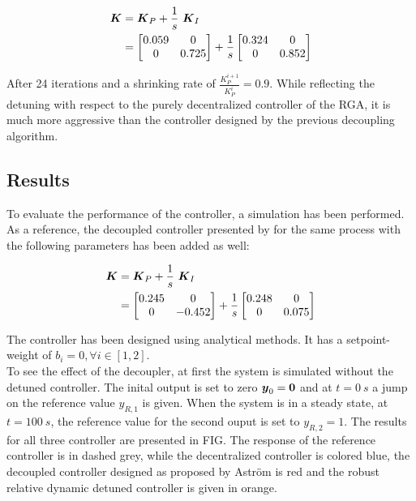 \begin{align*}
\mbox{\boldmath$K$} &= \mbox{\boldmath$K$}_P + \frac{1}{s}~ \mbox{\boldmath$K$}_I\\
&= \begin{bmatrix}
0.059 & 0 \\
0 & 0.725
\end{bmatrix}
+ \frac{1}{s}\begin{bmatrix}
0.324 & 0 \\
0 & 0.852
\end{bmatrix}
\end{align*}

After 24 iterations and a shrinking rate of $\frac{K_P^{i+1}}{K_P^{i}} = 0.9 $. While reflecting the detuning with respect to the purely decentralized controller of the RGA, it is much more aggressive than the controller designed by the previous decoupling algorithm. \\

\subsection{Results}
\label{c:fotd:s:rosenbrocks:ss:results}

To evaluate the performance of the controller, a simulation has been performed. As a reference, the decoupled controller presented by \cite{Astrom2001a} for the same process with the following parameters has been added as well:

\begin{align*}
\mbox{\boldmath$K$} &= \mbox{\boldmath$K$}_P + \frac{1}{s}~ \mbox{\boldmath$K$}_I\\
&= \begin{bmatrix}
0.245 & 0 \\
0 & -0.452
\end{bmatrix}
+ \frac{1}{s}\begin{bmatrix}
0.248 & 0 \\
0 & 0.075
\end{bmatrix}
\end{align*}

The controller has been designed using analytical methods. It has a setpoint-weight of $b_i = 0, \forall i \in [1,2]$.\\

To see the effect of the decoupler, at first the system is simulated without the detuned controller.  The inital output is set to zero $\mbox{\boldmath$y$}_0 = \mbox{\boldmath$0$}$ and at $t = 0~s$ a jump on the reference value $y_{R,1}$ is given. When the system is in a steady state, at $t = 100~s$, the reference value for the second ouput is set to $y_{R,2} = 1$. The results for all three controller are presented in FIG. The response of the reference controller is in dashed grey, while the decentralized controller is colored blue, the decoupled controller designed as proposed by Astr\"om is red and the robust relative dynamic detuned controller is given in orange.\\


